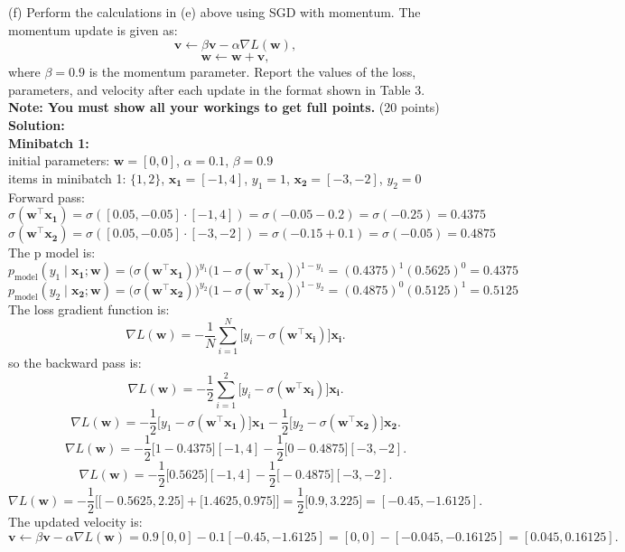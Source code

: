 \documentclass[a3paper,12pt]{article} %
\begin{document}
(f)
Perform the calculations in (e) above using SGD with momentum. The momentum update is given as:
\[
\mathbf{v} \gets \beta \mathbf{v} - \alpha \nabla L(\mathbf{w}),
\]
\[
\mathbf{w} \gets \mathbf{w} + \mathbf{v},
\]
where $\beta = 0.9$ is the momentum parameter. Report the values of the loss, parameters, and velocity after each update in the format shown in Table 3. \textbf{Note: You must show all your workings to get full points.}
\hfill (20 points)
\\ \textbf{Solution:}
\\ \textbf{Minibatch 1:}
\\ initial parameters: \(\mathbf{w} = [0, 0]\), \(\alpha = 0.1\), \(\beta = 0.9\)
\\ items in minibatch 1: \(\{1, 2\}\), \(\mathbf{x_1} = [-1, 4]\), \(y_1 = 1\), \(\mathbf{x_2} = [-3, -2]\), \(y_2 = 0\)
\\ Forward pass:
\[
\sigma(\mathbf{w}^\top \mathbf{x_1}) = \sigma([0.05, -0.05] \cdot [-1, 4]) = \sigma(-0.05 - 0.2) = \sigma(-0.25) = 0.4375
\]
\[
\sigma(\mathbf{w}^\top \mathbf{x_2}) = \sigma([0.05, -0.05] \cdot [-3, -2]) = \sigma(-0.15 + 0.1) = \sigma(-0.05) = 0.4875
\]
The p model is:
\[
p_{\text{model}}(y_1 \mid \mathbf{x_1}; \mathbf{w}) = \big(\sigma(\mathbf{w}^\top \mathbf{x_1})\big)^{y_1} \big(1 - \sigma(\mathbf{w}^\top \mathbf{x_1})\big)^{1-y_1} = (0.4375)^1 (0.5625)^0 = 0.4375
\]
\[
p_{\text{model}}(y_2 \mid \mathbf{x_2}; \mathbf{w}) = \big(\sigma(\mathbf{w}^\top \mathbf{x_2})\big)^{y_2} \big(1 - \sigma(\mathbf{w}^\top \mathbf{x_2})\big)^{1-y_2} = (0.4875)^0 (0.5125)^1 = 0.5125
\]
The loss gradient function is:
\[
\nabla L(\mathbf{w}) = -\frac{1}{N} \sum^N_{i=1} \big[y_i - \sigma(\mathbf{w}^\top \mathbf{x_i})\big] \mathbf{x_i}.
\]
so the backward pass is:
\[
\nabla L(\mathbf{w}) = -\frac{1}{2} \sum^2_{i=1} \big[y_i - \sigma(\mathbf{w}^\top \mathbf{x_i})\big] \mathbf{x_i}.
\]
\[
\nabla L(\mathbf{w}) = -\frac{1}{2} \big[y_1 - \sigma(\mathbf{w}^\top \mathbf{x_1})\big] \mathbf{x_1} - \frac{1}{2} \big[y_2 - \sigma(\mathbf{w}^\top \mathbf{x_2})\big] \mathbf{x_2}.
\]
\[
\nabla L(\mathbf{w}) = -\frac{1}{2} \big[1 - 0.4375\big] [-1, 4] - \frac{1}{2} \big[0 - 0.4875\big] [-3, -2].
\]
\[
\nabla L(\mathbf{w}) = -\frac{1}{2} \big[0.5625] [-1, 4] - \frac{1}{2} \big[-0.4875] [-3, -2].
\]
\[
\nabla L(\mathbf{w}) = -\frac{1}{2}\big[\big[-0.5625, 2.25\big] + \big[1.4625, 0.975\big]\big] = \frac{1}{2}\big[0.9, 3.225\big] = [-0.45, -1.6125].
\]
The updated velocity is:
\[
\mathbf{v} \gets \beta \mathbf{v} - \alpha \nabla L(\mathbf{w}) = 0.9 [0, 0] - 0.1 [-0.45, -1.6125] = [0, 0] - [-0.045, -0.16125] = [0.045, 0.16125].
\]
\end{document}
